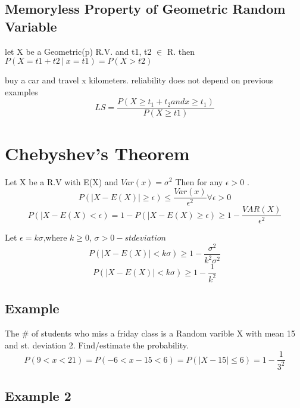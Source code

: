 \documentclass[11pt]{amsart}
\begin{document}
\subsection{Memoryless Property of Geometric Random Variable}
\par let X be a Geometric(p) R.V. and t1, t2 $\in$ R. then $P(X=t1+t2\ |
\ x=t1)=P(X>t2)$
\par buy a car and travel x kilometers. reliability does not depend on previous
examples
\begin{equation}
  LS = \frac{P( X \geq t_1 +t_2 and x \ge t_1)}{P(X \ge t1)}
\end{equation}
\section{Chebyshev's Theorem}
\par Let X be a R.V with E(X)  and  $Var(x) = \sigma^2 $ Then for any $\epsilon
> 0 $ .
\begin{equation}
  P(|X-E(X)| \ge \epsilon ) \le \frac{Var(x)}{\epsilon^2} \forall \epsilon >
  0
\end{equation}
\begin{equation}
  P(|X-E(X)< \epsilon) = 1-P(|X-E(X) \ge \epsilon) \ge
  1-\frac{VAR(X)}{\epsilon^2}
\end{equation}
\par Let $\epsilon = k\sigma$,where $k \ge 0$, $\sigma > 0-st deviation$
\begin{equation}
  P(|X-E(X)|<k\sigma)\ge 1 - \frac{\sigma^2}{k^2\sigma^2}
\end{equation}
\begin{equation}
  P(|X-E(X)|<k\sigma)\ge 1 - \frac{1} {k^2}
\end{equation}
\subsection{Example}
\par The \# of students who miss a friday class is a Random varible X with mean
15 and st. deviation 2. Find/estimate the probability.
\begin{equation}
  P(9 < x < 21) = P(-6 < x-15 < 6) = P(|X-15|\le 6) = 1 - \frac{1}{3^2}
\end{equation}
\subsection{Example 2}
\end{document}

